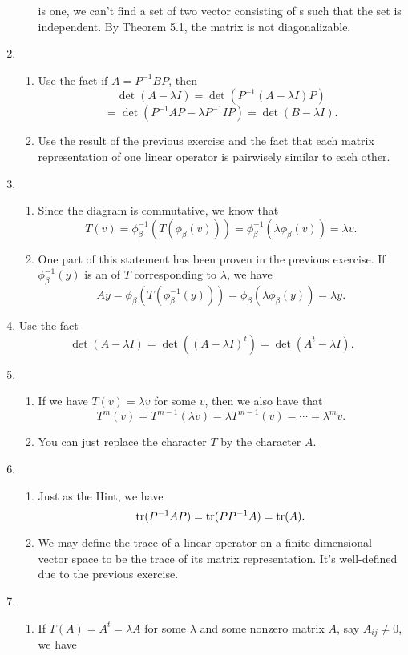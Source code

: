 \begin{enumerate}
\begin{enumerate}
is one, we can't find a set of two vector consisting of \egve s such that the set is independent. By Theorem 5.1, the matrix is not diagonalizable.
\end{enumerate}
\item \begin{enumerate}
\item Use the fact if $A=P^{-1}BP$, then 
\[\det(A-\lambda I)=\det(P^{-1}(A-\lambda I)P)\]
\[=\det(P^{-1}AP-\lambda P^{-1}IP)=\det(B-\lambda I).\]
\item Use the result of the previous exercise and the fact that each matrix representation of one linear operator is pairwisely similar to each other.
\end{enumerate}
\item \begin{enumerate}
\item Since the diagram is commutative, we know that 
\[T(v)=\phi_{\beta}^{-1}(T(\phi_{\beta}(v)))=\phi_{\beta}^{-1}(\lambda \phi_{\beta}(v))=\lambda v.\]
\item One part of this statement has been proven in the previous exercise. If $\phi_{\beta}^{-1}(y)$ is an \egve{} of $T$ corresponding to $\lambda $, we have 
\[Ay=\phi_{\beta}(T(\phi_{\beta}^{-1}(y)))=\phi_{\beta}(\lambda \phi_{\beta}(y))=\lambda y.\]
\end{enumerate}
\item Use the fact 
\[\det(A-\lambda I)=\det((A-\lambda I)^t)=\det(A^t-\lambda I).\]
\item \begin{enumerate}
\item If we have $T(v)=\lambda v$ for some $v$, then we also have that 
\[T^m(v)=T^{m-1}(\lambda v)=\lambda T^{m-1}(v)=\cdots =\lambda^m v.\]
\item You can just replace the character $T$ by the character $A$.
\end{enumerate}
\item \begin{enumerate}
\item Just as the Hint, we have 
\[\operatorname{tr}(P^{-1}AP)=\operatorname{tr}(PP^{-1}A)=\operatorname{tr}(A).\]
\item We may define the trace of a linear operator on a finite-dimensional vector space to be the trace of its matrix representation. It's well-defined due to the previous exercise.
\end{enumerate}
\item \begin{enumerate}
\item If $T(A)=A^t=\lambda A$ for some $\lambda $ and some nonzero matrix $A$, say $A_{ij}\neq 0$, we have 

\end{enumerate}
\end{enumerate}
